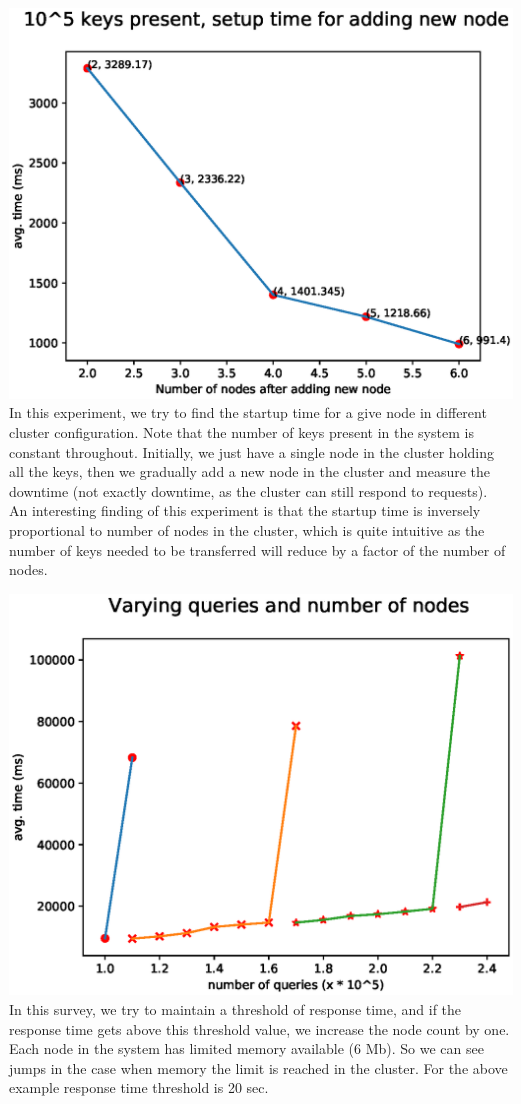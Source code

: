\documentclass[11pt]{article}
\begin{document}
\includegraphics[width=\textwidth]{fig7.eps}
In this experiment, we try to find the startup time for a give node in different cluster configuration.
Note that the number of keys present in the system is constant throughout. Initially, we just have a single
node in the cluster holding all the keys, then we gradually add a new node in the cluster and measure
the downtime (not exactly downtime, as the cluster can still respond to requests). \\

An interesting finding of this experiment is that the startup time is inversely proportional to number of
nodes in the cluster, which is quite intuitive as the number of keys needed to be transferred will reduce
by a factor of the number of nodes.

\includegraphics[width=\textwidth]{fig8.eps}
In this survey, we try to maintain a threshold of response time, and if the response time gets above
this threshold value, we increase the node count by one. Each node in the system has limited memory 
available (6 Mb). So we can see jumps in the case when memory the limit is reached in the cluster.
For the above example response time threshold is 20 sec.
\pagebreak
\end{document}
